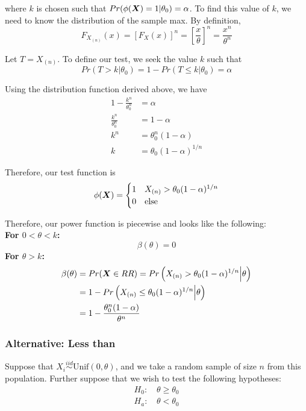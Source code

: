 \documentclass[]{article}
\newcommand{\bfX}{\mbox{\boldmath $X$}}
\begin{document}
where $k$ is chosen such that $Pr(\phi(\bfX) = 1|\theta_0) = \alpha$. To find this value of $k$, we need to know the distribution of the sample max. By definition, 
\[
F_{X_{(n)}}(x) = \left[F_X(x)\right]^n = \left[\frac{x}{\theta}\right]^n = \frac{x^n}{\theta^n}
\]


Let $T = X_{(n)}$. To define our test, we seek the value $k$ such that 
\[
Pr(T > k | \theta_0) = 1 - Pr(T \leq k | \theta_0) = \alpha
\]

Using the distribution function derived above, we have
\[
\begin{split}
1 - \frac{k^n}{\theta_0^n} &= \alpha \\
\frac{k^n}{\theta_0^n} &= 1 - \alpha \\
k^n &= \theta_0^n(1-\alpha) \\
k &= \theta_0(1-\alpha)^{1/n}
\end{split}
\]

Therefore, our test function is
\[
\phi(\bfX) = \begin{cases}
1 & X_{(n)} > \theta_0(1-\alpha)^{1/n} \\
0 & \text{else}
\end{cases}
\]

Therefore, our power function is piecewise and looks like the following:\\
\textbf{For $0 < \theta < k$:}
\[
\beta(\theta) = 0
\]
\textbf{For $\theta > k$:}
\[
\begin{split}
\beta(\theta) &= Pr(\bfX \in RR) = Pr\left(X_{(n)} > \theta_0(1-\alpha)^{1/n} \Big| \theta\right) \\
&= 1 - Pr\left(X_{(n)}\leq \theta_0(1-\alpha)^{1/n} \Big| \theta\right) \\
&= 1 - \frac{\theta_0^n(1-\alpha)}{\theta^n}
\end{split}
\]

\subsubsection{Alternative: Less than}

Suppose that $X_i \stackrel{iid}{\sim} \text{Unif}(0, \theta)$, and we take a random sample of size $n$ from this population. Further suppose that we wish to test the following hypotheses:
\[
\begin{split}
\text{$H_0$: }& \theta \geq \theta_0 \\
\text{$H_a$: }& \theta < \theta_0
\end{split}
\]
\end{document}
